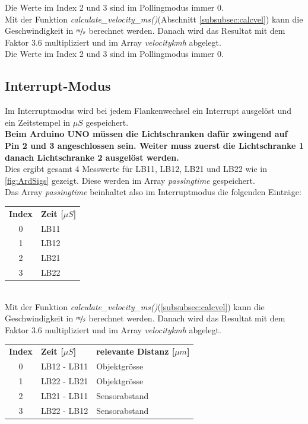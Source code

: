 Die Werte im Index 2 und 3 sind im Pollingmodus immer 0.\\

Mit der Funktion \textit{calculate\_velocity\_ms()}(Abschnitt \ref{subsubsec:calcvel}) kann die Geschwindigkeit in $\nicefrac{m}{s}$ berechnet werden. Danach wird das Resultat mit dem Faktor 3.6 multipliziert und im Array \textit{velocitykmh} abgelegt.\\

Die Werte im Index 2 und 3 sind im Pollingmodus immer 0.\\


\subsection{Interrupt-Modus} \label{subsec:interrupt}
Im Interruptmodus wird bei jedem Flankenwechsel ein Interrupt ausgelöst und ein Zeitstempel in $\mu S$ gespeichert.\\
\textbf{Beim Arduino UNO müssen die Lichtschranken dafür zwingend auf Pin 2 und 3 angeschlossen sein. Weiter muss zuerst die Lichtschranke 1 danach Lichtschranke 2 ausgelöst werden.}\\
Dies ergibt gesamt 4 Messwerte für LB11, LB12, LB21 und LB22 wie in \ref{fig:ArdSigs} gezeigt. Diese werden im Array \textit{passingtime} gespeichert.\\

Das Array \textit{passingtime} beinhaltet also im Interruptmodus die folgenden Einträge:\\
\begin{tabular}{cl}
    \textbf{Index}&\textbf{Zeit [$\mu S$]} \\
    0&LB11 \\
    1&LB12 \\
    2&LB21 \\
    3&LB22 \\
\end{tabular}\\

Mit der Funktion \textit{calculate\_velocity\_ms()}(\ref{subsubsec:calcvel}) kann die Geschwindigkeit in $\nicefrac{m}{s}$ berechnet werden. Danach wird das Resultat mit dem Faktor 3.6 multipliziert und im Array \textit{velocitykmh} abgelegt.\\

\begin{tabular}{cll}
    \textbf{Index}&\textbf{Zeit [$\mu S$]} & \textbf{relevante Distanz [$\mu m$]} \\
    0&LB12 - LB11 & Objektgrösse\\
    1&LB22 - LB21 & Objektgrösse\\
    2&LB21 - LB11 & Sensorabstand\\
    3&LB22 - LB12 & Sensorabstand\\
\end{tabular}\\

